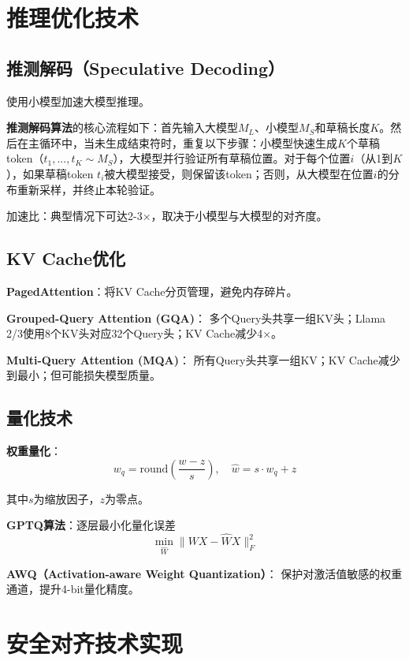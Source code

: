 \section{推理优化技术}

\subsection{推测解码（Speculative Decoding）}

使用小模型加速大模型推理。

\textbf{推测解码算法}的核心流程如下：首先输入大模型$M_L$、小模型$M_S$和草稿长度$K$。然后在主循环中，当未生成结束符时，重复以下步骤：小模型快速生成$K$个草稿token（$t_1, ..., t_K \sim M_S$），大模型并行验证所有草稿位置。对于每个位置$i$（从1到$K$），如果草稿token $t_i$被大模型接受，则保留该token；否则，从大模型在位置$i$的分布重新采样，并终止本轮验证。

加速比：典型情况下可达2-3×，取决于小模型与大模型的对齐度。

\subsection{KV Cache优化}

\textbf{PagedAttention}：将KV Cache分页管理，避免内存碎片\cite{vllm2024}。

\textbf{Grouped-Query Attention (GQA)}：
多个Query头共享一组KV头；Llama 2/3使用8个KV头对应32个Query头；KV Cache减少4×。

\textbf{Multi-Query Attention (MQA)}：
所有Query头共享一组KV；KV Cache减少到最小；但可能损失模型质量。

\subsection{量化技术}

\textbf{权重量化}：
\begin{equation}
w_q = \text{round}\left(\frac{w - z}{s}\right), \quad \hat{w} = s \cdot w_q + z
\end{equation}

其中$s$为缩放因子，$z$为零点。

\textbf{GPTQ算法}：逐层最小化量化误差
\begin{equation}
\min_{\hat{W}} \|WX - \hat{W}X\|_F^2
\end{equation}

\textbf{AWQ（Activation-aware Weight Quantization）}：
保护对激活值敏感的权重通道，提升4-bit量化精度。

\section{安全对齐技术实现}

